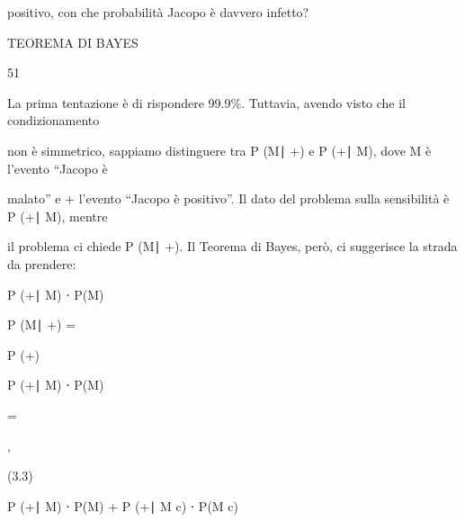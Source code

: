 \documentclass[a4paper,portrait,12pt]{article}
\begin{document}
\begin{flushleft}
positivo, con che probabilit\`{a} Jacopo \`{e} davvero infetto?
\end{flushleft}





\begin{flushleft}
 TEOREMA DI BAYES
\end{flushleft}





51





\begin{flushleft}
La prima tentazione \`{e} di rispondere 99.9\%. Tuttavia, avendo visto che il condizionamento
\end{flushleft}


\begin{flushleft}
non \`{e} simmetrico, sappiamo distinguere tra P (M∣ +) e P (+∣ M), dove M \`{e} l'evento ``Jacopo \`{e}
\end{flushleft}


\begin{flushleft}
malato'' e + l'evento ``Jacopo \`{e} positivo''. Il dato del problema sulla sensibilit\`{a} \`{e} P (+∣ M), mentre
\end{flushleft}


\begin{flushleft}
il problema ci chiede P (M∣ +). Il Teorema di Bayes, per\`{o}, ci suggerisce la strada da prendere:
\end{flushleft}


\begin{flushleft}
P (+∣ M) ⋅ P(M)
\end{flushleft}


\begin{flushleft}
P (M∣ +) =
\end{flushleft}


\begin{flushleft}
P (+)
\end{flushleft}


\begin{flushleft}
P (+∣ M) ⋅ P(M)
\end{flushleft}


=


,


(3.3)


\begin{flushleft}
P (+∣ M) ⋅ P(M) + P (+∣ M c) ⋅ P(M c)
\end{flushleft}
\end{document}
